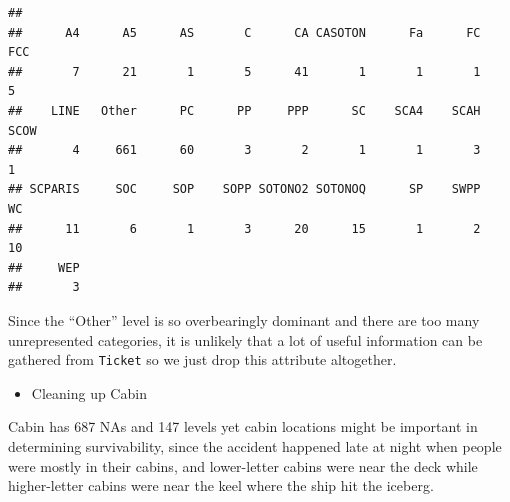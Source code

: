 \documentclass[]{article}
\newenvironment{Shaded}{\begin{snugshade}}{\end{snugshade}}
\newcommand{\KeywordTok}[1]{\textcolor[rgb]{0.13,0.29,0.53}{\textbf{#1}}}
\newcommand{\CommentTok}[1]{\textcolor[rgb]{0.56,0.35,0.01}{\textit{#1}}}
\newcommand{\OperatorTok}[1]{\textcolor[rgb]{0.81,0.36,0.00}{\textbf{#1}}}
\newcommand{\NormalTok}[1]{#1}
\providecommand{\tightlist}{%
  \setlength{\itemsep}{0pt}\setlength{\parskip}{0pt}}
\begin{document}
\begin{Shaded}
\end{Shaded}

\begin{verbatim}
## 
##      A4      A5      AS       C      CA CASOTON      Fa      FC     FCC 
##       7      21       1       5      41       1       1       1       5 
##    LINE   Other      PC      PP     PPP      SC    SCA4    SCAH    SCOW 
##       4     661      60       3       2       1       1       3       1 
## SCPARIS     SOC     SOP    SOPP SOTONO2 SOTONOQ      SP    SWPP      WC 
##      11       6       1       3      20      15       1       2      10 
##     WEP 
##       3
\end{verbatim}

Since the ``Other'' level is so overbearingly dominant and there are too
many unrepresented categories, it is unlikely that a lot of useful
information can be gathered from \texttt{Ticket} so we just drop this
attribute altogether.

\begin{itemize}
\tightlist
\item
  Cleaning up Cabin
\end{itemize}

Cabin has 687 NAs and 147 levels yet cabin locations might be important
in determining survivability, since the accident happened late at night
when people were mostly in their cabins, and lower-letter cabins were
near the deck while higher-letter cabins were near the keel where the
ship hit the iceberg.
\end{document}
